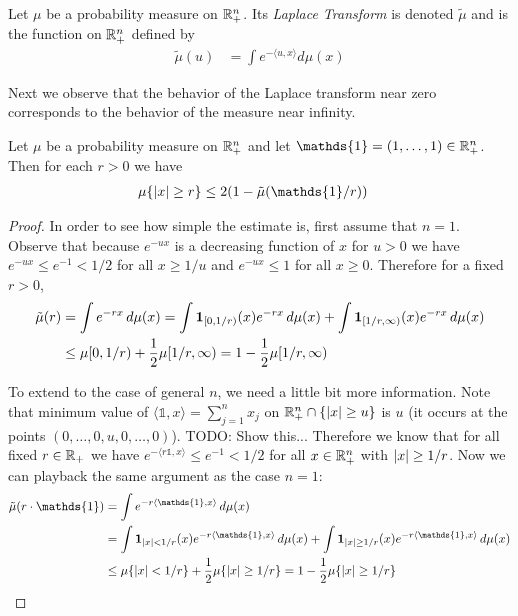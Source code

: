\begin{defn}Let $\mu$ be a probability measure on $\mathbb{R}^n_+$. Its
  \emph{Laplace Transform} is denoted $\tilde{\mu}$ and is the function on
  $\mathbb{R}^n_+$ defined by 
\begin{align*}
\tilde{\mu}(u) &= \int e^{-\langle u,x \rangle} d \mu(x)
\end{align*}
\end{defn}

Next we observe that the behavior of the Laplace transform near zero
corresponds to the behavior of the measure near infinity.
\begin{lem}\label{LaplaceTailEstimate}Let $\mu$ be a probability
  measure on $\mathbb{R}^n_+$ and let $\mathds{1}=(1, \dotsc, 1) \in
  \reals^n_+$.  Then for each $r > 0$ we have
\begin{align*}
\mu\lbrace \abs{x} \geq r\rbrace &\leq 2(1 - \tilde{\mu}(\mathds{1}/r))
\end{align*}
\end{lem}
\begin{proof}
In order to see how simple the estimate is, first assume that $n=1$.
Observe that because $e^{-ux}$ is a decreasing function of $x$ for $u
> 0$ we have $e^{-ux}  \leq e^{-1} < 1/2$ for all $x
\geq 1/u$ and $e^{-ux} \leq 1$ for all $x \geq 0$.  Therefore for a fixed $r > 0$,
\begin{align*}
\tilde{\mu}(r) &= \int e^{-rx} \, d\mu(x) = \int \textbf{1}_{[0,1/r)}(x)  e^{-rx}
\, d\mu(x)  + \int \textbf{1}_{[1/r,\infty)}(x)  e^{-rx} \,
d\mu(x)  \\
&\leq \mu[0,1/r) + \frac{1}{2} \mu[1/r, \infty) = 1 - \frac{1}{2} \mu[1/r, \infty) 
\end{align*}

To extend to the case of general $n$, we need a little bit more
information.  Note that minimum value of
$\langle \mathds{1}, x\rangle = \sum_{j=1}^n x_j$ on $\mathbb{R}^n_+ \cap \lbrace \left \vert x \right \vert \geq u \rbrace$ is
$u$ (it occurs at the points $(0, \dotsc, 0,u,0, \dotsc,0)$).  TODO:
Show this...
Therefore we know that for all fixed $r \in \mathbb{R}_+$ we have $e^{-\langle r
\mathds{1}, x \rangle} \leq e^{-1} < 1/2$ for all $x \in \mathbb{R}^n_+$
with $\left \vert x \right \vert \geq 1/r$.  Now we can playback the same argument as the
case $n=1$:
\begin{align*}
\tilde{\mu}(r \cdot \mathds{1}) &= \int e^{-r\langle \mathds{1}, x \rangle}
\, d\mu(x) \\
&= \int \characteristic{\abs{x} < 1/r}(x)  e^{-r\langle \mathds{1}, x \rangle}
\, d\mu(x)  + \int \characteristic{\abs{x} \geq 1/r}(x)  e^{-r\langle \mathds{1}, x \rangle} \,
d\mu(x)  \\
&\leq \mu \lbrace \abs{x} < 1/r \rbrace + \frac{1}{2} \mu \lbrace
\abs{x} \geq 1/r \rbrace = 1 - \frac{1}{2} \mu \lbrace \abs{x} \geq
1/r \rbrace
\end{align*}
\end{proof}

